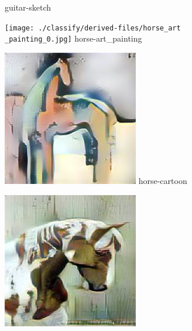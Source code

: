 \documentclass{article}
\begin{document}
\begin{figure}[htp]
\begin{minipage}{0.14285714285714285\linewidth}
        {guitar-sketch}
    \end{minipage}%
    \begin{minipage}{0.14285714285714285\linewidth}
        \texttt{[image: ./classify/derived-files/horse\_art\\\_painting\_0.jpg]}
        {horse-art\_painting}
    \end{minipage}%
    \begin{minipage}{0.14285714285714285\linewidth}
        \includegraphics[width=\linewidth]{./classify/derived-files/horse_cartoon_0.jpg}
        {horse-cartoon}
    \end{minipage}%
    \begin{minipage}{0.14285714285714285\linewidth}
        \includegraphics[width=\linewidth]{./classify/derived-files/horse_photo_0.jpg}

\end{minipage}
\end{figure}
\end{document}
